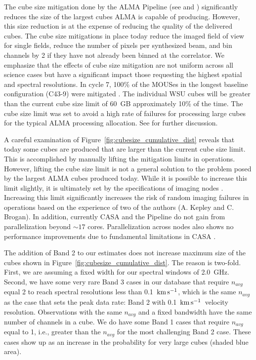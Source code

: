 \documentclass[preprint]{aastex631}
\newcommand{\kms}{\ensuremath{\rm{ km \, s^{-1}}}}
\begin{document}
The cube size mitigation done by the ALMA Pipeline (see \citealt{Hunter2023TheHeuristics} and \citealt{Kepley2023Mitigation}) significantly reduces the size of the largest cubes ALMA is capable of producing.  However, this size reduction is at the expense of reducing the quality of the delivered cubes. The cube size mitigations in place today reduce the imaged field of view for single fields, reduce the number of pixels per synthesized beam, and bin channels by 2 if they have not already been binned at the correlator.  We emphasize that the effects of cube size mitigation are not uniform across all science cases but have a significant impact those requesting the highest spatial and spectral resolutions. In cycle 7, 100\% of the MOUSes in the longest baseline configuration (C43-9) were mitigated \citep{Kepley2023Mitigation}.    The individual WSU cubes will be greater than the current cube size limit of 60~GB approximately 10\% of the time.  The cube size limit was set to avoid a high rate of failures for processing large cubes for the typical ALMA processing allocation. See \citet{Kepley2023Mitigation} for further discussion.

A careful examination of Figure~\ref{fig:cubesize_cumulative_dist} reveals that today some cubes are produced that are larger than the current cube size limit. This is accomplished by manually lifting the mitigation limits in operations. However, lifting the cube size limit is not a general solution to the problem posed by the  largest ALMA cubes produced today.  While it is possible to increase this limit slightly, it is ultimately set by the specifications of imaging nodes \citep{Kepley2023Mitigation}. Increasing this limit significantly increases the risk of random imaging failures in operations based on the experience of two of the authors (A. Kepley and C. Brogan). In addition, currently CASA and the Pipeline do not gain from parallelization beyond $\sim17$ cores. Parallelization across nodes also shows no performance improvements due to fundamental limitations in CASA \citep{Kepley2023ImagingCubes}.

The addition of Band 2 to our estimates does not increase maximum size of the cubes shown in Figure~\ref{fig:cubesize_cumulative_dist}. The reason is two-fold. First, we are assuming a fixed width for our spectral windows of 2.0~GHz. Second, we have some very rare Band 3 cases in our database that require $n_{avg}$ equal 2 to reach spectral resolutions less than 0.1~\kms, which is the same $n_{avg}$ as the case that sets the peak data rate: Band 2 with 0.1~\kms\ velocity resolution. Observations with the same $n_{avg}$ and a fixed bandwidth have the same number of channels in a cube. We do have some Band 1 cases that require $n_{avg}$ equal to 1, i.e., greater than the $n_{avg}$ for the most challenging Band 2 case. These cases show up as an increase in the probability for very large cubes (shaded blue area). 
\end{document}
